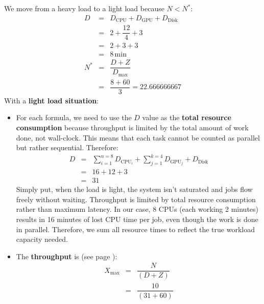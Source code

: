 \begin{enumerate}
    We move from a heavy load to a light load because $N < N^{*}$:
    \begin{equation*}
        \begin{array}{rcl}
            D &=& D_{\text{CPU}} + D_{\text{GPU}} + D_{\text{Disk}} \\ [.5em]
            &=& 2 + \dfrac{12}{4} + 3 \\ [.5em]
            &=& 2 + 3 + 3 \\ [.5em]
            &=& 8\, \text{min} \\ [1em]
            N^{*} &=& \dfrac{D+Z}{D_{\max}} \\ [1.5em]
            &=& \dfrac{8 + 60}{3} = 22.666666667
        \end{array}
    \end{equation*}
    With a \textbf{light load situation}:
    \begin{itemize}
        \item For each formula, we need to use the $D$ value as the \textbf{total resource consumption} because throughput is limited by the total amount of work done, not wall-clock. This means that each task cannot be counted as parallel but rather sequential. Therefore:
        \begin{equation*}
            \begin{array}{rcl}
                D &=& \displaystyle\sum_{i=1}^{n=8} D_{\text{CPU}_{i}} + \displaystyle\sum_{j=1}^{k=4} D_{\text{GPU}_{j}} + D_{\text{Disk}} \\ [1.5em]
                &=& 16 + 12 + 3 \\ [.5em]
                &=& 31
            \end{array}
        \end{equation*}
        Simply put, when the load is light, the system isn't saturated and jobs flow freely without waiting. Throughput is limited by total resource consumption rather than maximum latency. In our case, 8 CPUs (each working 2 minutes) results in 16 minutes of lost CPU time per job, even though the work is done in parallel. Therefore, we sum all resource times to reflect the true workload capacity needed.
        \item The \textbf{throughput} is (see page \pageref{eq: upper bound for light load}):
        \begin{equation*}
            \begin{array}{rcl}
                X_{\max} &=& \dfrac{N}{\left(D + Z\right)} \\ [1.3em]
                &=& \dfrac{10}{\left(31 + 60\right)} \\ [1.3em]

\end{array}
\end{equation*}
\end{itemize}
\end{enumerate}
